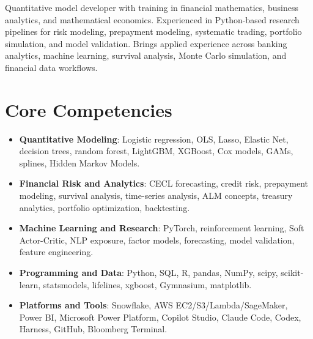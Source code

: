 \documentclass[11pt,a4paper,sans]{moderncv}
\begin{document}
\makecvtitle


\vspace{6pt}
\small{Quantitative model developer with training in financial mathematics, business analytics, and mathematical economics. Experienced in Python-based research pipelines for risk modeling, prepayment modeling, systematic trading, portfolio simulation, and model validation. Brings applied experience across banking analytics, machine learning, survival analysis, Monte Carlo simulation, and financial data workflows.}


\section{Core Competencies}
\vspace{1pt}
\begin{itemize}

\item \textbf{Quantitative Modeling}: Logistic regression, OLS, Lasso, Elastic Net, decision trees, random forest, LightGBM, XGBoost, Cox models, GAMs, splines, Hidden Markov Models.

\item \textbf{Financial Risk and Analytics}: CECL forecasting, credit risk, prepayment modeling, survival analysis, time-series analysis, ALM concepts, treasury analytics, portfolio optimization, backtesting.

\item \textbf{Machine Learning and Research}: PyTorch, reinforcement learning, Soft Actor-Critic, NLP exposure, factor models, forecasting, model validation, feature engineering.

\item \textbf{Programming and Data}: Python, SQL, R, pandas, NumPy, scipy, scikit-learn, statsmodels, lifelines, xgboost, Gymnasium, matplotlib.

\item \textbf{Platforms and Tools}: Snowflake, AWS EC2/S3/Lambda/SageMaker, Power BI, Microsoft Power Platform, Copilot Studio, Claude Code, Codex, Harness, GitHub, Bloomberg Terminal.

\end{itemize}
\end{document}
